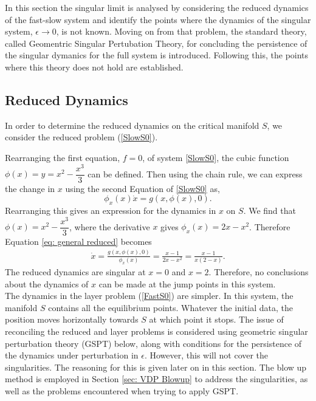 In this section the singular limit is analysed by considering the reduced dynamics of the fast-slow system and identify the points where the dynamics of the singular system, $\epsilon \to 0$, is not known.
Moving on from that problem, the standard theory, called Geomentric Singular Pertubation Theory, for concluding the persistence of the singular dymanics for the full system is introduced. Following this, the points where this theory does not hold are established.

\subsection{Reduced Dynamics}
In order to determine the reduced dynamics on the critical manifold $S$, we consider the reduced problem (\ref{SlowS0}). 

Rearranging the first equation, $f=0$, of system \ref{SlowS0}, the cubic function  $ \phi(x) = y = x^2-\dfrac{x^3}{3}$ can be defined.
Then using the chain rule, we can express the change in $x$ using the second Equation of \ref{SlowS0} as,
\begin{equation}
\phi_x(x)\dot{x}=g(x,\phi(x),0).
\label{eq: general reduced}
\end{equation}
Rearranging this gives an expression for the dynamics in $x$ on $S$.
We find that $\phi(x)=x^2-\dfrac{x^3}{3}$, where the derivative \wrt $x$ gives $\phi_x(x)=2x-x^2$.
Therefore Equation \ref{eq: general reduced} becomes 
\begin{align*}
\dot{x} = \frac{g(x,\phi(x),0)}{ \phi_x(x)} = \frac{ x-1}{2x-x^2} =\frac{ x-1}{x(2-x)}.
\end{align*}
The reduced dynamics are singular at $x=0$ and $x=2$. Therefore, no conclusions about the dynamics of $x$ can be made at the jump points in this system. \\ 

The dynamics in the layer problem (\ref{FastS0}) are simpler. In this system, the manifold $S$ contains all the equilibrium points. Whatever the initial data, the position moves horizontally towards $S$ at which point it stops. The issue of reconciling the reduced and layer problems is considered using geometric singular perturbation theory (GSPT) below, along with conditions for the persistence of the dynamics under perturbation in $\epsilon$. However, this will not cover the singularities. The reasoning for this is given later on in this section. The blow up method is employed in Section \ref{sec: VDP Blowup} to address the singularities, as well as the problems encountered when trying to apply GSPT. 

